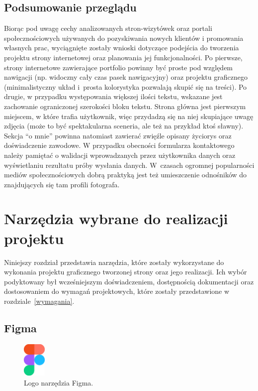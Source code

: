 \documentclass[a4paper, 12pt, twoside]{article}
\numberwithin{figure}{section}
\begin{document}
\begin{sloppypar}
\subsection{Podsumowanie przeglądu}

Biorąc pod uwagę cechy analizowanych stron-wizytówek oraz portali społecznościowych używanych do pozyskiwania nowych klientów i promowania własnych prac, wyciągnięte zostały wnioski dotyczące podejścia do tworzenia projektu strony internetowej oraz planowania jej funkcjonalności. Po pierwsze, strony internetowe zawierające portfolio powinny być proste pod względem nawigacji (np. widoczny cały czas pasek nawigacyjny) oraz projektu graficznego (minimalistyczny układ i~prosta kolorystyka pozwalają skupić się na treści). Po drugie, w przypadku występowania większej ilości tekstu, wskazane jest zachowanie ograniczonej szerokości bloku tekstu. Strona główna jest pierwszym miejscem, w które trafia użytkownik, więc przydadzą się na niej skupiające uwagę zdjęcia (może to być spektakularna sceneria, ale też na przykład ktoś sławny). Sekcja ``o mnie'' powinna natomiast zawierać zwięźle opisany życiorys oraz doświadczenie zawodowe. W przypadku obecności formularza kontaktowego należy pamiętać o walidacji wprowadzanych przez użytkownika danych oraz wyświetlaniu rezultatu próby wysłania danych. W~czasach ogromnej popularności mediów społecznościowych dobrą praktyką jest też umieszczenie odnośników do znajdujących się tam profili fotografa.


\newpage 

\section{Narzędzia wybrane do realizacji projektu}

Niniejszy rozdział przedstawia narzędzia, które zostały wykorzystane do wykonania projektu graficznego tworzonej strony oraz jego realizacji. Ich wybór podyktowany był wcześniejszym doświadczeniem, dostępnością dokumentacji oraz dostosowaniem do wymagań projektowych, które zostały przedstawione w rozdziale~\ref{wymagania}.

\subsection*{Figma}

\begin{figure}[H] 
    \centering
        \includegraphics[width=0.1\textwidth]{images/figma-logo.png}
   \caption{Logo narzędzia Figma.}
   \label{fig:figma-logo.png}
\end{figure}



\end{sloppypar}
\end{document}
